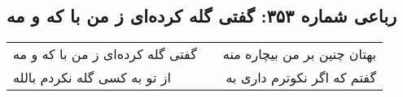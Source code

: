 \begin{center}
\section*{رباعی شماره ۳۵۳: گفتی گله کرده‌ای ز من با که و مه}
\label{sec:sh353}
\begin{longtable}{l p{0.5cm} r}
گفتی گله کرده‌ای ز من با که و مه
&&
بهتان چنین بر من بیچاره منه
\\
از تو به کسی گله نکردم بالله
&&
گفتم که اگر نکوترم داری به
\\
\end{longtable}
\end{center}
